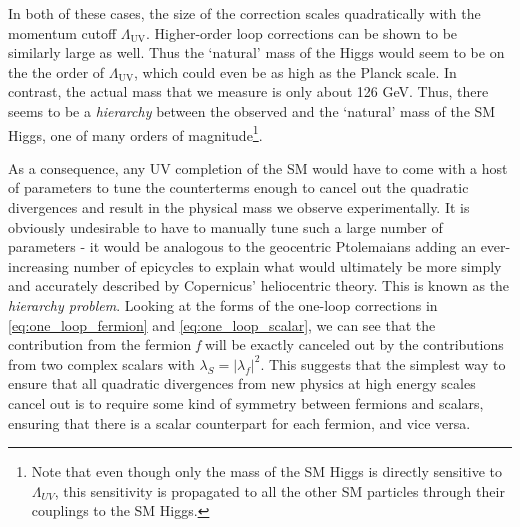 \strictpagecheck
\noindent In both of these cases, the size of the correction scales quadratically with the momentum cutoff $\Lambda_\text{UV}$. Higher-order loop corrections can be shown to be similarly large as well. Thus the `natural' mass of the Higgs would seem to be on the the order of $\Lambda_\text{UV}$, which could even be as high as the Planck scale. In contrast, the actual mass that we measure is only about 126 GeV. Thus, there seems to be a \emph{hierarchy} between the observed and the `natural' mass of the SM Higgs, one of many orders of magnitude\footnote{Note that even though only the mass of the SM Higgs is directly sensitive to $\Lambda_{UV}$, this sensitivity is propagated to all the other SM particles through their couplings to the SM Higgs.}.

As a consequence, any UV completion of the SM would have to come with a host of parameters to tune the counterterms enough to cancel out the quadratic divergences and result in the physical mass we observe experimentally.
It is obviously undesirable to have to manually tune such a large number of parameters - it would be analogous to the geocentric Ptolemaians adding an ever-increasing number of epicycles to explain what would ultimately be more simply and accurately described by Copernicus' heliocentric theory. This is known as the \emph{hierarchy problem}. 
Looking at the forms of the one-loop corrections in \eqref{eq:one_loop_fermion} and \eqref{eq:one_loop_scalar}, we can see that the contribution from the fermion \emph{f} will be exactly canceled out by the contributions from two complex scalars with $\lambda_S = |\lambda_f|^2$. This suggests that the simplest way to ensure that all quadratic divergences from new physics at high energy scales cancel out is to require some kind of symmetry between fermions and scalars, ensuring that there is a scalar counterpart for each fermion, and vice versa.

